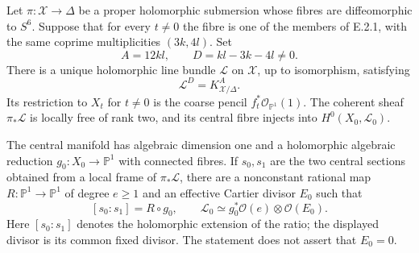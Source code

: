 \begin{proposition}
Let $\pi:\mathcal X\to\Delta$ be a proper holomorphic submersion
whose fibres are diffeomorphic to $S^6$.  Suppose that for every
$t\ne0$ the fibre is one of the members of E.2.1, with the same
coprime multiplicities $(3k,4l)$.  Set
\[
 A=12kl,\qquad D=kl-3k-4l\ne0.
\]
There is a unique holomorphic line bundle $\mathcal L$ on
$\mathcal X$, up to isomorphism, satisfying
\[
 \mathcal L^{D}=K_{\mathcal X/\Delta}^{A}.
\]
Its restriction to $X_t$ for $t\ne0$ is the coarse pencil
$f_t^*\mathcal O_{\mathbb P^1}(1)$.  The coherent sheaf
$\pi_*\mathcal L$ is locally free of rank two, and its central
fibre injects into $H^0(X_0,\mathcal L_0)$.

The central manifold has algebraic dimension one and a
holomorphic algebraic reduction $g_0:X_0\to\mathbb P^1$ with
connected fibres.  If $s_0,s_1$ are the two central sections
obtained from a local frame of $\pi_*\mathcal L$, there are a
nonconstant rational map $R:\mathbb P^1\to\mathbb P^1$ of
degree $e\ge1$ and an effective Cartier divisor $E_0$ such that
\[
 [s_0:s_1]=R\circ g_0,\qquad
 \mathcal L_0\simeq g_0^*\mathcal O(e)\otimes\mathcal O(E_0).
\]
Here $[s_0:s_1]$ denotes the holomorphic extension of the ratio;
the displayed divisor is its common fixed divisor.  The
statement does not assert that $E_0=0$.
\end{proposition}
